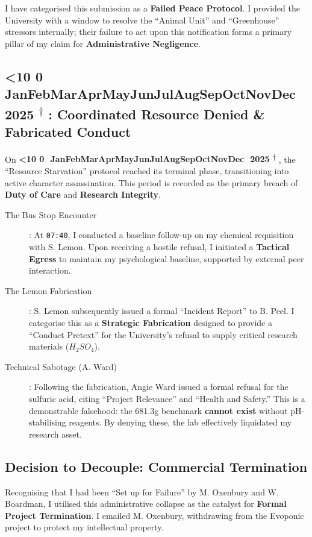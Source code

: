 \documentclass{EMBASSY}
\DeclareRobustCommand{\gmt}[3]{%
    \texorpdfstring{%
        {\color{DateGold}\textbf{%
            \ifnum#1<10 0\fi#1\,\textperiodcentered\,%
            \ifcase#2\or Jan\or Feb\or Mar\or Apr\or May\or Jun\or Jul\or Aug\or Sep\or Oct\or Nov\or Dec\fi
            \,\textperiodcentered\,20#3%
            \textsuperscript{$\dagger$}%
        }}%
    }{%
        (#1/#2/#3)%
    }%
}
\begin{document}
\noindent I have categorised this submission as a \textbf{Failed Peace Protocol}. I provided the University with a window to resolve the ``Animal Unit'' and ``Greenhouse'' stressors internally; their failure to act upon this notification forms a primary pillar of my claim for \textbf{Administrative Negligence}.

\subsection{\gmt{3}{11}{25}: Coordinated Resource Denied \& Fabricated Conduct}
On \gmt{3}{11}{25}, the ``Resource Starvation'' protocol reached its terminal phase, transitioning into active character assassination. This period is recorded as the primary breach of \textbf{Duty of Care} and \textbf{Research Integrity}.

\begin{description}
	\item[The Bus Stop Encounter]: At \texttt{07:40}, I conducted a baseline follow-up on my chemical requisition with S. Lemon. Upon receiving a hostile refusal, I initiated a \textbf{Tactical Egress} to maintain my psychological baseline, supported by external peer interaction.
	\item[The Lemon Fabrication]: S. Lemon subsequently issued a formal ``Incident Report'' to B. Peel. I categorise this as a \textbf{Strategic Fabrication} designed to provide a ``Conduct Pretext'' for the University's refusal to supply critical research materials ($H_{2}SO_{4}$).
	\item[Technical Sabotage (A. Ward)]: Following the fabrication, Angie Ward issued a formal refusal for the sulfuric acid, citing ``Project Relevance'' and ``Health and Safety.'' This is a demonstrable falsehood: the 681.3g benchmark \textbf{cannot exist} without pH-stabilising reagents. By denying these, the lab effectively liquidated my research asset.
\end{description}

\subsection{Decision to Decouple: Commercial Termination}
Recognising that I had been ``Set up for Failure'' by M. Oxenbury and W. Boardman, I utilised this administrative collapse as the catalyst for \textbf{Formal Project Termination}. I emailed M. Oxenbury, withdrawing from the Evoponic project to protect my intellectual property.
\end{document}
